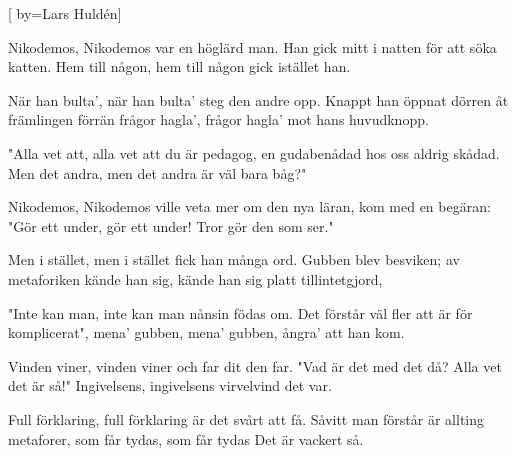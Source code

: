 

[
	by={Lars Huldén}] 


\beginverse*
Nikodemos, Nikodemos
var en höglärd man.
Han gick mitt i natten
för att söka katten.
Hem till någon, hem till någon
gick istället han.
\endverse

\beginverse*
När han bulta', när han bulta' 
steg den andre opp.
Knappt han öppnat dörren
åt främlingen förrän
frågor hagla', frågor hagla' 
mot hans huvudknopp.
\endverse

\beginverse*
"Alla vet att, alla vet att
du är pedagog,
en gudabenådad
hos oss aldrig skådad.
Men det andra, men det andra
är väl bara båg?"
\endverse

\beginverse*
Nikodemos, Nikodemos
ville veta mer
om den nya läran,
kom med en begäran:
"Gör ett under, gör ett under!
Tror gör den som ser."
\endverse

\beginverse*
Men i stället, men i stället
fick han många ord.
Gubben blev besviken;
av metaforiken
kände han sig, kände han sig
platt tillintetgjord,
\endverse

\beginverse*
"Inte kan man, inte kan man
nånsin födas om.
Det förstår väl fler att
är för komplicerat",
mena' gubben, mena' gubben,
ångra' att han kom.
\endverse

\beginverse*
Vinden viner, vinden viner
och far dit den far.
"Vad är det med det då?
Alla vet det är så!"
Ingivelsens, ingivelsens
virvelvind det var.
\endverse

\beginverse*
Full förklaring, full förklaring
är det svårt att få.
Såvitt man förstår är
allting metaforer,
som får tydas, som får tydas
Det är vackert så.
\endverse
\endsong
